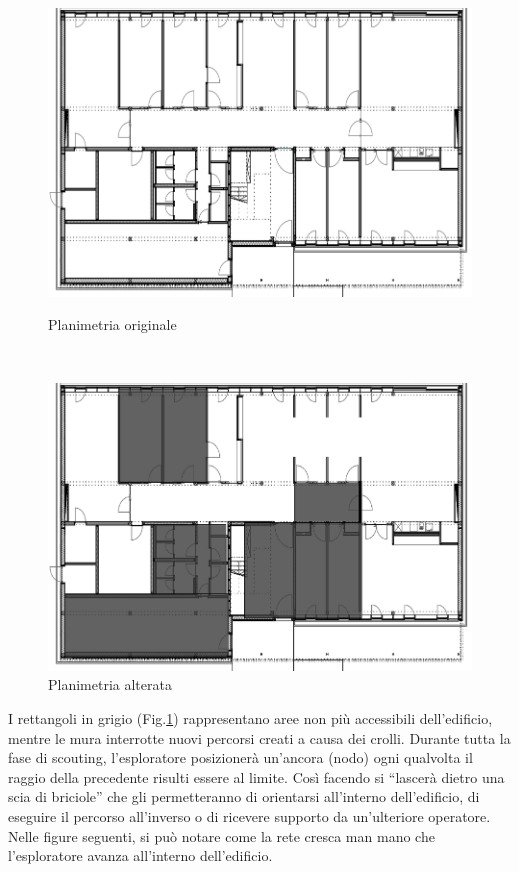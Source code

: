 \begin{figure}[h]
	\begin{minipage}[b]{6cm}
		\centering
		\includegraphics[scale=0.35]{Introduzione/piantina1.png}
		\caption{Planimetria originale}
		\label{fig:planOriginale}
	\end{minipage}
	\ \hspace{10 mm} \
	\begin{minipage}[b]{6cm}
		\centering
		\includegraphics[scale=0.35]{Introduzione/piantina2.png}
		\caption{Planimetria alterata}
		\label{fig:planAlterata}
	\end{minipage}
\end{figure}

\newpage
I rettangoli in grigio (Fig.\ref{fig:planAlterata}) rappresentano aree non più accessibili dell’edificio, mentre le mura interrotte nuovi percorsi creati a causa dei crolli. 
Durante tutta la fase di scouting, l’esploratore posizionerà un’ancora (nodo) ogni qualvolta il raggio della precedente risulti essere al limite. Così facendo si “lascerà dietro una scia di briciole” che gli permetteranno di orientarsi all’interno dell’edificio, di eseguire il percorso all’inverso o di ricevere supporto da un’ulteriore operatore. Nelle figure seguenti, si può notare come la rete cresca man mano che l'esploratore avanza all'interno dell'edificio.

